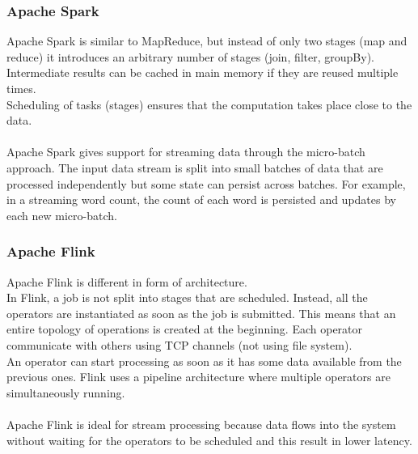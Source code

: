\documentclass[10pt,a4paper]{article}
\begin{document}
\subsubsection{Apache Spark}
Apache Spark is similar to MapReduce, but instead of only two stages (map and reduce) it introduces an arbitrary number of stages (join, filter, groupBy). Intermediate results can be cached in main memory if they are reused multiple times. \\ Scheduling of tasks (stages) ensures that the computation takes place close to the data. \\ \\
Apache Spark gives support for streaming data through the micro-batch approach. The input data stream is split into small batches of data that are processed independently but some state can persist across batches. For example, in a streaming word count, the count of each word is persisted and updates by each new micro-batch.
\subsubsection{Apache Flink}
Apache Flink is different in form of architecture. \\
In Flink, a job is not split into stages that are scheduled. Instead, all the operators are instantiated as soon as the job is submitted. This means that an entire topology of operations is created at the beginning. Each operator communicate with others using TCP channels (not using file system). \\ An operator can start processing as soon as it has some data available from the previous ones. Flink uses a pipeline architecture where multiple operators are simultaneously running. \\ \\
Apache Flink is ideal for stream processing because data flows into the system without waiting for the operators to be scheduled and this result in lower latency.
\end{document}

